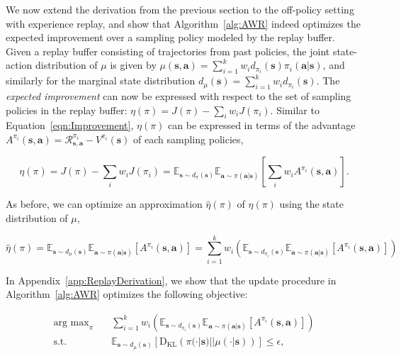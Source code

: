 We now extend the derivation from the previous section to the off-policy setting with experience replay, and show that Algorithm~\ref{alg:AWR} indeed optimizes the expected improvement over a sampling policy modeled by the replay buffer. Given a replay buffer consisting of trajectories from past policies, the joint state-action distribution of $\mu$ is given by $\mu({\mathbf{s}}, {\mathbf{a}}) = \sum_{i=1}^k w_i d_{\pi_i}({\mathbf{s}}) \pi_i({\mathbf{a}} | {\mathbf{s}})$, and similarly for the marginal state distribution $d_\mu({\mathbf{s}}) = \sum_{i=1}^k w_i d_{\pi_i}({\mathbf{s}})$. The \textit{expected improvement} can now be expressed with respect to the set of sampling policies in the replay buffer: $\eta(\pi) = J(\pi) - \sum_{i} w_i J(\pi_i)$. Similar to Equation~\ref{eqn:Improvement}, $\eta(\pi)$ can be expressed in terms of the advantage ${A^{\pi_i}({\mathbf{s}}, {\mathbf{a}}) = \mathcal{R}_{{\mathbf{s}}, {\mathbf{a}}}^{\pi_i} - V^{\pi_i}({\mathbf{s}})}$ of each sampling policies,

\begin{equation}
    \eta(\pi) = J(\pi) - \sum_{i} w_i J(\pi_i)  = \mathbb{E}_{{\mathbf{s}} \sim d_{\pi}({\mathbf{s}})}\mathbb{E}_{{\mathbf{a}} \sim \pi({\mathbf{a}}|{\mathbf{s}})}\left[ \sum_i w_i A^{\pi_i}({\mathbf{s}}, {\mathbf{a}}) \right] .
\end{equation}

As before, we can optimize an approximation $\hat{\eta}(\pi)$ of $\eta(\pi)$ using the state distribution of $\mu$,

\begin{equation}
    \hat{\eta}(\pi) = \mathbb{E}_{{\mathbf{s}} \sim d_{\mu}({\mathbf{s}})} \mathbb{E}_{{\mathbf{a}} \sim \pi({\mathbf{a}}|{\mathbf{s}})} \left[A^{\pi_i}({\mathbf{s}}, {\mathbf{a}}) \right] = \sum_{i=1}^k w_i \left( \mathbb{E}_{{\mathbf{s}} \sim d_{\pi_i}({\mathbf{s}})} \mathbb{E}_{{\mathbf{a}} \sim \pi({\mathbf{a}}|{\mathbf{s}})} \left[A^{\pi_i}({\mathbf{s}}, {\mathbf{a}}) \right] \right)
\end{equation}

In Appendix~\ref{app:ReplayDerivation}, we show that the update procedure in Algorithm~\ref{alg:AWR} optimizes the following objective:

\begin{align}
    \mathop{\mathrm{arg \ max}}_{\pi} \quad & \sum_{i=1}^k w_i \left( \mathbb{E}_{{\mathbf{s}} \sim d_{\pi_i}({\mathbf{s}})} \mathbb{E}_{{\mathbf{a}} \sim \pi({\mathbf{a}}|{\mathbf{s}})} \left[A^{\pi_i}({\mathbf{s}}, {\mathbf{a}}) \right] \right) \\
    \textrm{s.t.} \quad & \mathbb{E}_{{\mathbf{s}} \sim d_\mu({\mathbf{s}})} \left[ \mathrm{D_{KL}} \left( \pi(\cdot |{\mathbf{s}}) || \mu(\cdot |{\mathbf{s}}) \right) \right] \leq \epsilon ,
\end{align}

